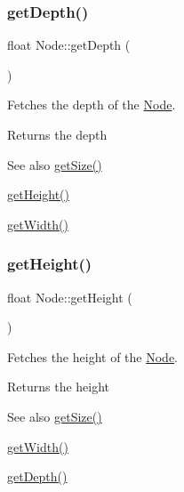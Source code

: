 \subsubsection{\texorpdfstring{getDepth()}{getDepth()}}
{\footnotesize\ttfamily float Node\+::get\+Depth (\begin{DoxyParamCaption}{ }\end{DoxyParamCaption})}



Fetches the depth of the \mbox{\hyperlink{classsage_1_1Node}{Node}}. 

\begin{DoxyReturn}{Returns}
the depth 
\end{DoxyReturn}
\begin{DoxySeeAlso}{See also}
\mbox{\hyperlink{classsage_1_1Node_ad14a04d08b5261c27d3080f6a5e12836}{get\+Size()}} 

\mbox{\hyperlink{classsage_1_1Node_a6af5a8378ac8d2c3490adbc2a03f1247}{get\+Height()}} 

\mbox{\hyperlink{classsage_1_1Node_a65163ffabcfe9f482282ea37ead6fc5f}{get\+Width()}} 
\end{DoxySeeAlso}
\mbox{\label{classsage_1_1Node_a6af5a8378ac8d2c3490adbc2a03f1247}} 
\subsubsection{\texorpdfstring{getHeight()}{getHeight()}}
{\footnotesize\ttfamily float Node\+::get\+Height (\begin{DoxyParamCaption}{ }\end{DoxyParamCaption})}



Fetches the height of the \mbox{\hyperlink{classsage_1_1Node}{Node}}. 

\begin{DoxyReturn}{Returns}
the height 
\end{DoxyReturn}
\begin{DoxySeeAlso}{See also}
\mbox{\hyperlink{classsage_1_1Node_ad14a04d08b5261c27d3080f6a5e12836}{get\+Size()}} 

\mbox{\hyperlink{classsage_1_1Node_a65163ffabcfe9f482282ea37ead6fc5f}{get\+Width()}} 

\mbox{\hyperlink{classsage_1_1Node_a5c4c28939c7adf7e4a65dbb02c0cbcd3}{get\+Depth()}} 
\end{DoxySeeAlso}
\mbox{\label{classsage_1_1Node_a250bbfa6108773d1035f4bd61441fdd0}} 
